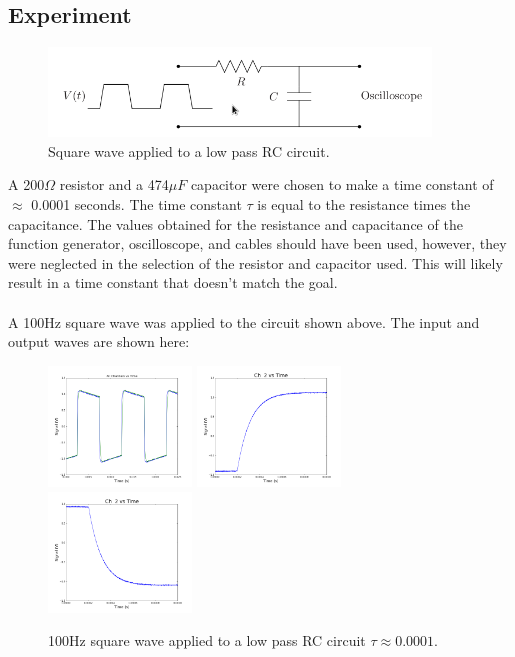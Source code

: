\documentclass[a4paper,12pt]{article}
\begin{document}
\subsection*{Experiment}
\begin{figure}[h]
\centering
\includegraphics[width=4in]{sam_lab2/lab2_experiment_2.png}
\caption{Square wave applied to a low pass RC circuit.}
\end{figure}
\noindent
A 200$\Omega$ resistor and a 474$\mu F$ capacitor were chosen to make a time constant of $\approx$ 0.0001 seconds.  The time constant $\tau$ is equal to the resistance times the capacitance.  The values obtained for the resistance and capacitance of the function generator, oscilloscope, and cables should have been used, however, they were neglected in the selection of the resistor and capacitor used. This will likely result in a time constant that doesn't match the goal.
\\
\\
A 100Hz square wave was applied to the circuit shown above.  The input and output waves are shown here:
\begin{figure}[h]
\centering
\includegraphics[width=1.5in]{sam_lab2/2e_waveform.png}
\includegraphics[width=1.5in]{sam_lab2/2e_rise.png}
\includegraphics[width=1.5in]{sam_lab2/2e_fall.png}
\caption{100Hz square wave applied to a low pass RC circuit $\tau\approx0.0001$.}
\end{figure}
\end{document}
